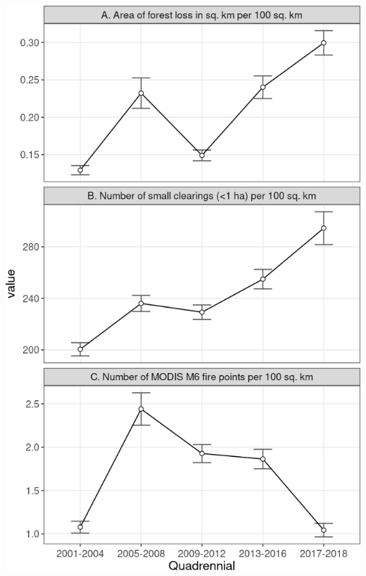 \documentclass[10pt,landscape,a3paper]{article}
\begin{document}
\begin{center}\includegraphics{img/modelling/aa-eda-ts-13} \end{center}
\end{document}
